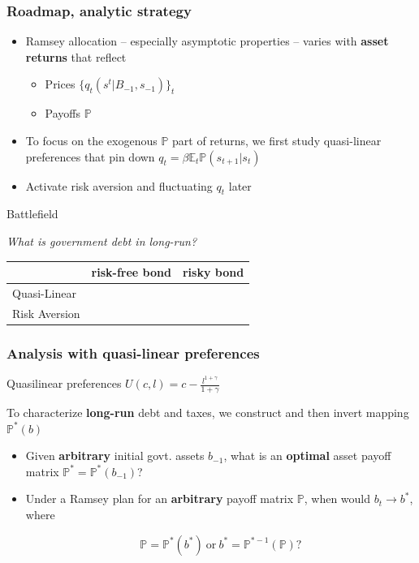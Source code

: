 \documentclass{beamer}
\begin{document}
\begin{frame}
\frametitle{Roadmap, analytic strategy}

	\begin{itemize}
	\item Ramsey allocation -- especially asymptotic properties --   varies with   \textbf{asset returns} that reflect
	\begin{itemize}
	 \item Prices $\{q_t(s^t|B_{-1},s_{-1})\}_t$
	 \item Payoffs $\mathbb{P}$
	\end{itemize}
	
\item To focus on the exogenous $\mathbb{P}$ part of returns, we first study quasi-linear  preferences  that pin down $q_t=\beta \mathbb{E}_t
\mathbb{P}(s_{t+1}|s_t)$

\item Activate  risk aversion and fluctuating $q_t$ later
	
\end{itemize}
\end{frame}



\begin{frame}{Battlefield}

\textit{What is government debt in long-run?}

\vspace{3mm}


\bigskip
\begin{tabular}[h]{| l | p{1.25in} | p{1.25in} |}
	\hline
	&risk-free bond & risky bond \\
	\hline
	Quasi-Linear&  & \\
	\hline
	Risk Aversion & &  \\
	\hline
\end{tabular}


\vspace{4mm}



\end{frame}

\begin{frame}
\frametitle{Analysis with quasi-linear preferences}


Quasilinear preferences $U(c,l)=c-\frac{l^{1+\gamma}}{1+\gamma}$

 To characterize \textbf{long-run}  debt and  taxes,  we construct and then invert  mapping $\mathbb{P}^*(b)$

\begin{itemize}
 \item Given \textbf{arbitrary} initial govt. assets $b_{-1}$, what is  an \textbf{optimal} asset payoff matrix $\mathbb{P}^* =\mathbb{P}^*(b_{-1})$?

 \item Under a Ramsey plan for an \textbf{arbitrary} payoff matrix $\mathbb{P}$,  when would  $b_t \to b^*$, where

	\[\mathbb{P}=\mathbb{P}^*(b^*) \ \textrm{or} \ b^* = \mathbb{P}^{* -1}(\mathbb{P}) ?\]
	
\end{itemize}
\end{frame}
\end{document}
